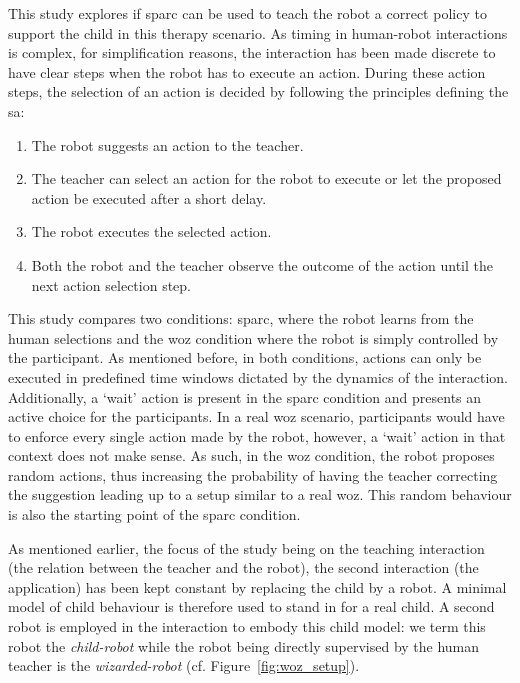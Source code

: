 This study explores if \gls{sparc} can be used to teach the robot a correct policy to support the child in this therapy scenario. As timing in human-robot interactions is complex, for simplification reasons, the interaction has been made discrete to have clear steps when the robot has to execute an action. During these action steps, the selection of an action is decided by following the principles defining the \gls{sa}:
\begin{enumerate}
	\item The robot suggests an action to the teacher.
	\item The teacher can select an action for the robot to execute or let the proposed action be executed after a short delay.
	\item The robot executes the selected action.
	\item Both the robot and the teacher observe the outcome of the action until the next action selection step.
\end{enumerate}



This study compares two conditions: \gls{sparc}, where the robot learns from the human selections and the \gls{woz} condition where the robot is simply controlled by the participant. As mentioned before, in both conditions, actions can only be executed in predefined time windows dictated by the dynamics of the interaction. Additionally, a `wait' action is present in the \gls{sparc} condition and presents an active choice for the participants. 
In a real \gls{woz} scenario, participants would have to enforce every single action made by the robot, however, a `wait' action in that context does not make sense. As such, in the \gls{woz} condition, the robot proposes random actions, thus increasing the probability of having the teacher correcting the suggestion leading up to a setup similar to a real \gls{woz}. This random behaviour is also the starting point of the \gls{sparc} condition.

As mentioned earlier, the focus of the study being on the teaching interaction (the relation between the teacher and the robot), the second interaction (the application) has been kept constant by replacing the child by a robot. A minimal model of child behaviour is therefore used to stand in for a real child. A second robot is employed in the interaction to embody this child model: we term this robot the \textit{child-robot} while the robot being directly supervised by the human teacher is the \textit{wizarded-robot} (cf. Figure~\ref{fig:woz_setup}).

